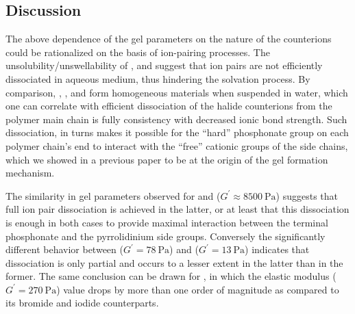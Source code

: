 \documentclass[journal=jacsat,manuscript=article]{achemso}
\begin{document}
\subsection{Discussion}

The above dependence of the gel parameters on the nature of the counterions could be rationalized on the basis of ion-pairing processes. The unsolubility/unswellability of ,  and  suggest that ion pairs are not efficiently dissociated in aqueous medium, thus hindering the solvation process. By comparison, , ,  and  form homogeneous materials when suspended in water, which one can correlate with efficient dissociation of the halide counterions from the polymer main chain is fully consistency with decreased ionic bond strength. Such dissociation, in turns makes it possible for the ``hard'' phosphonate group on each polymer chain's end to interact with the ``free'' cationic groups of the side chains, which we showed in a previous paper to be at the origin of the gel formation mechanism\cite{Srour2014}.

The similarity in gel parameters observed for  and  ($G^\prime\approx\SI{8500}{\pascal}$) suggests that full ion pair dissociation is achieved in the latter, or at least that this dissociation is enough in both cases to provide maximal interaction between the terminal phosphonate and the pyrrolidinium side groups. Conversely the significantly different behavior between  ($G^\prime= \SI{78}{\pascal}$) and  ($G^\prime= \SI{13}{\pascal}$) indicates that dissociation is only partial and occurs to a lesser extent in the latter than in the former. The same conclusion can be drawn for , in which the elastic modulus ($G^\prime= \SI{270}{\pascal}$) value drops by more than one order of magnitude as compared to its bromide and iodide counterparts.
\end{document}
